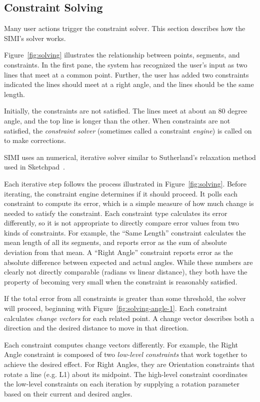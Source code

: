 \subsection{Constraint Solving}

Many user actions trigger the constraint solver. This section
describes how the SIMI's solver works.

Figure~\ref{fig:solving} illustrates the relationship between points,
segments, and constraints. In the first pane, the system has
recognized the user's input as two lines that meet at a common
point. Further, the user has added two constraints indicated the lines
should meet at a right angle, and the lines should be the same length.

Initially, the constraints are not satisfied. The lines meet at about
an 80 degree angle, and the top line is longer than the other. When
constraints are not satisfied, the \textit{constraint solver}
(sometimes called a constraint \textit{engine}) is called on to make
corrections.

SIMI uses an numerical, iterative solver similar to Sutherland's
relaxation method used in Sketchpad~\cite{sutherland-sketchpad}. 

Each iterative step follows the process illustrated in
Figure~\ref{fig:solving}. Before iterating, the constraint engine
determines if it should proceed. It polls each constraint to compute
its error, which is a simple measure of how much change is needed to
satisfy the constraint. Each constraint type calculates its error
differently, so it is not appropriate to directly compare error values
from two kinds of constraints. For example, the ``Same Length''
constraint calculates the mean length of all its segments, and reports
error as the sum of absolute deviation from that mean. A ``Right
Angle'' constraint reports error as the absolute difference between
expected and actual angles. While these numbers are clearly not
directly comparable (radians vs linear distance), they both have the
property of becoming very small when the constraint is reasonably
satisfied.



If the total error from all constraints is greater than some
threshold, the solver will proceed, beginning with
Figure~\ref{fig:solving-angle-1}. Each constraint calculates
\textit{change vectors} for each related point. A change vector
describes both a direction and the desired distance to move in that
direction. 

Each constraint computes change vectors differently. For example, the
Right Angle constraint is composed of two \textit{low-level
  constraints} that work together to achieve the desired effect. For
Right Angles, they are Orientation constraints that rotate a line
(e.g. L1) about its midpoint. The high-level constraint coordinates
the low-level constraints on each iteration by supplying a rotation
parameter based on their current and desired angles.

